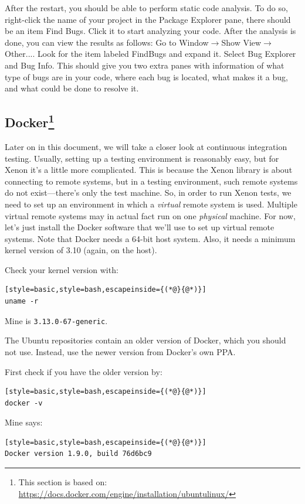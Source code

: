 \documentclass[12pt, a4paper, twoside,openany,titlepage]{article}
\begin{document}
{After the restart, you should be able to perform static code analysis. To do so, right-click the name of your project in the \textsf{Package Explorer} pane, there should be an item \textsf{Find Bugs}. Click it to start analyzing your code. After the analysis is done, you can view the results as follows: Go to \textsf{Window}$\rightarrow$\textsf{Show View}$\rightarrow$\textsf{Other...}. Look for the item labeled \textsf{FindBugs} and expand it. Select \textsf{Bug Explorer} and \textsf{Bug Info}. This should give you two extra panes with information of what type of bugs are in your code, where each bug is located, what makes it a bug, and what could be done to resolve it.


\subsection{Docker\footnote{This section is based on: \url{https://docs.docker.com/engine/installation/ubuntulinux/}}}

Later on in this document, we will take a closer look at continuous integration testing. Usually, setting up a testing environment is reasonably easy, but for Xenon it's a little more complicated. This is because the Xenon library is about connecting to remote systems, but in a testing environment, such remote systems do not exist---there's only the test machine. So, in order to run Xenon tests, we need to set up an environment in which a \textit{virtual} remote system is used. Multiple virtual remote systems may in actual fact run on one \textit{physical} machine. For now, let's just install the Docker software that we'll use to set up virtual remote systems. Note that Docker needs a 64-bit host system. Also, it needs a minimum kernel version of 3.10 (again, on the host).

Check your kernel version with:
\begin{lstlisting}[style=basic,style=bash,escapeinside={(*@}{@*)}]
uname -r
\end{lstlisting}
Mine is \texttt{3.13.0-67-generic}.

The Ubuntu repositories contain an older version of Docker, which you should not use. Instead, use the newer version from Docker's own PPA.

First check if you have the older version by:
\begin{lstlisting}[style=basic,style=bash,escapeinside={(*@}{@*)}]
docker -v
\end{lstlisting}
Mine says:
\begin{lstlisting}[style=basic,style=bash,escapeinside={(*@}{@*)}]
Docker version 1.9.0, build 76d6bc9
\end{lstlisting}

}
\end{document}
